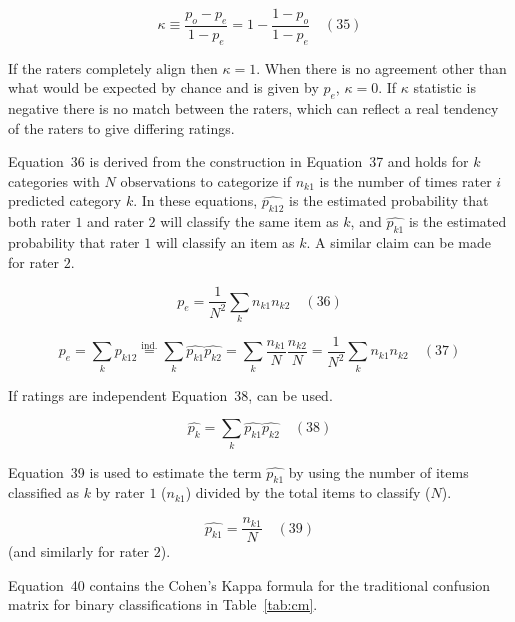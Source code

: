 \documentclass[preprint,12pt]{elsarticle}
\begin{document}
\begin{equation}
	\kappa \equiv {\frac {p_{o}-p_{e}}{1-p_{e}}}=1-{\frac {1-p_{o}}{1-p_{e}}}
	\quad\left(35\right)
\end{equation}

If the raters completely align then $\kappa = 1$. When there is no agreement other than what would be expected by chance and is given by $p_{e}$, $\kappa = 0$. If $\kappa$ statistic is negative \cite{sim2005kappa} there is no match between the raters, which can reflect a real tendency of the raters to give differing ratings.

Equation~36 is derived from the construction in Equation~37 and holds for $k$ categories with $N$ observations to categorize if $n_{k1}$ is the number of times rater $i$ predicted category $k$. In these equations, ${\widehat{p_{k12}}}$ is the estimated probability that both rater $1$ and rater $2$ will classify the same item as $k$, and ${\widehat {p_{k1}}}$ is the estimated probability that rater $1$ will classify an item as $k$. A similar claim can be made for rater $2$.

\begin{equation}
	p_{e}={\frac {1}{N^{2}}}\sum_{k}n_{k1}n_{k2}
	\quad\left(36\right)
\end{equation}

\begin{equation}
	p_{e}=\sum_{k}{\widehat {p_{k12}}}{\overset{\text{ind.}}{=}}\sum_{k}{\widehat {p_{k1}}}{\widehat {p_{k2}}}=\sum_{k}{\frac {n_{k1}}{N}}{\frac {n_{k2}}{N}}={\frac {1}{N^{2}}}\sum_{k}n_{k1}n_{k2}
	\quad\left(37\right)
\end{equation}

If ratings are independent Equation~38, can be used.

\begin{equation}
	\textstyle{\widehat{p_{k}}}=\sum_{k}{\widehat{p_{k1}}}{\widehat {p_{k2}}}
	\quad\left(38\right)
\end{equation}

Equation~39 is used to estimate the term $\widehat{p_{k1}}$ by using the number of items classified as $k$ by rater $1$ ($n_{k1}$) divided by the total items to classify ($N$).

\begin{equation}
	\widehat {p_{k1}}=\frac{n_{k1}}{N}
	\quad\left(39\right)
\end{equation}
 (and similarly for rater $2$).
 
Equation~40 contains the Cohen's Kappa formula \cite{chicco2021matthews} for the traditional confusion matrix for binary classifications in Table~\ref{tab:cm}.
\end{document}
